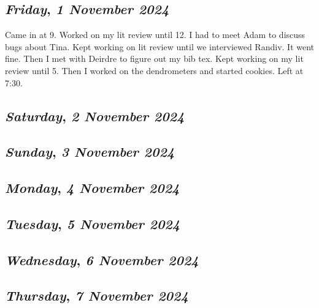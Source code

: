 \begin{center}
\section*{\month}
\end{center}

\def\day{\textit{1 November 2024}}
\def\weekday{\textit{Friday}}
\subsection*{\weekday, \day}
Came in at 9. Worked on my lit review until 12. I had to meet Adam to discuss bugs about Tina. Kept working on lit review until we interviewed Randiv. It went fine. Then I met with Deirdre to figure out my bib tex. Kept working on my lit review until 5. Then I worked on the dendrometers and started cookies. Left at 7:30.
\def\day{\textit{2 November 2024}}
\def\weekday{\textit{Saturday}}
\subsection*{\weekday, \day}

\def\day{\textit{3 November 2024}}
\def\weekday{\textit{Sunday}}
\subsection*{\weekday, \day}

\def\day{\textit{4 November 2024}}
\def\weekday{\textit{Monday}}
\subsection*{\weekday, \day}

\def\day{\textit{5 November 2024}}
\def\weekday{\textit{Tuesday}}
\subsection*{\weekday, \day}

\def\day{\textit{6 November 2024}}
\def\weekday{\textit{Wednesday}}
\subsection*{\weekday, \day}

\def\day{\textit{7 November 2024}}
\def\weekday{\textit{Thursday}}
\subsection*{\weekday, \day}

